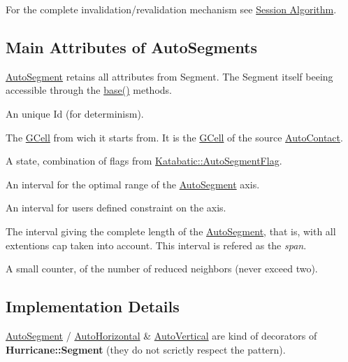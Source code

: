 For the complete invalidation/revalidation mechanism see \hyperlink{classKatabatic_1_1Session_secSessionAlgo}{Session Algorithm}.\hypertarget{classKatabatic_1_1AutoSegment_secASAttributes}{}\subsection{Main Attributes of Auto\+Segments}\label{classKatabatic_1_1AutoSegment_secASAttributes}
\hyperlink{classKatabatic_1_1AutoSegment}{Auto\+Segment} retains all attributes from Segment. The Segment itself beeing accessible through the \hyperlink{classKatabatic_1_1AutoSegment_ade416d0483aefe986988fa89a7cf6fcf}{base()} methods. 
\begin{DoxyItemize}
\item An unique {\ttfamily Id} (for determinism). 
\item The \hyperlink{classKatabatic_1_1GCell}{G\+Cell} from wich it starts from. It is the \hyperlink{classKatabatic_1_1GCell}{G\+Cell} of the source \hyperlink{classKatabatic_1_1AutoContact}{Auto\+Contact}. 
\item A state, combination of flags from \hyperlink{namespaceKatabatic_a94585537ee1724ea9315578ec54380f4}{Katabatic\+::\+Auto\+Segment\+Flag}. 
\item An interval for the optimal range of the \hyperlink{classKatabatic_1_1AutoSegment}{Auto\+Segment} axis. 
\item An interval for user\textquotesingle{}s defined constraint on the axis. 
\item The interval giving the complete length of the \hyperlink{classKatabatic_1_1AutoSegment}{Auto\+Segment}, that is, with all extentions cap taken into account. This interval is refered as the {\itshape span}. 
\item A small counter, of the number of reduced neighbors (never exceed two). 
\end{DoxyItemize}\hypertarget{classKatabatic_1_1AutoSegment_secASImplementation}{}\subsection{Implementation Details}\label{classKatabatic_1_1AutoSegment_secASImplementation}
\hyperlink{classKatabatic_1_1AutoSegment}{Auto\+Segment} / \hyperlink{classKatabatic_1_1AutoHorizontal}{Auto\+Horizontal} \& \hyperlink{classKatabatic_1_1AutoVertical}{Auto\+Vertical} are kind of decorators of \textbf{ Hurricane\+::\+Segment} (they do not scrictly respect the pattern).

